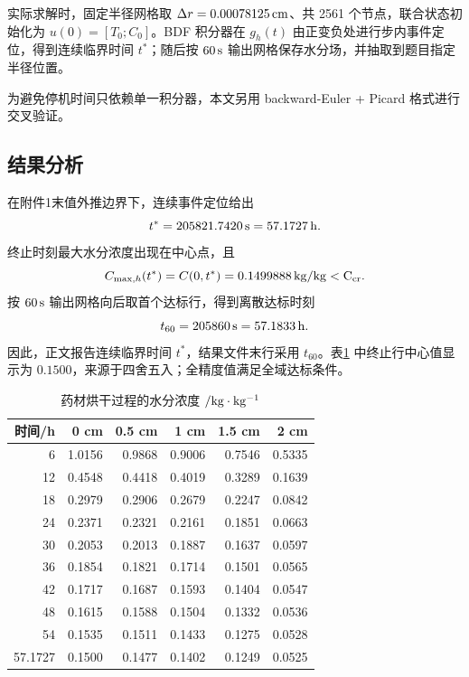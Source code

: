 \documentclass[UTF8,a4paper,12pt]{ctexart}
\begin{document}
实际求解时，固定半径网格取 $\Delta r=0.00078125\rm\,cm$、共 2561 个节点，联合状态初始化为 $u(0)=[T_0;C_0]$。BDF 积分器在 $g_h(t)$ 由正变负处进行步内事件定位，得到连续临界时间 $t^*$；随后按 $60\rm\,s$ 输出网格保存水分场，并抽取到题目指定半径位置。

为避免停机时间只依赖单一积分器，本文另用 backward-Euler + Picard 格式进行交叉验证。

\subsection{结果分析}
在附件1末值外推边界下，连续事件定位给出
\begin{equation}
  t^*=205821.7420\rm\,s=57.1727\rm\,h.
\end{equation}
终止时刻最大水分浓度出现在中心点，且
\begin{equation}
  C_{\max,h}(t^*)=C(0,t^*)=0.1499888\rm\,kg/kg<C_{\rm cr}.
\end{equation}
按 $60\rm\,s$ 输出网格向后取首个达标行，得到离散达标时刻
\begin{equation}
  t_{60}=205860\rm\,s=57.1833\rm\,h.
\end{equation}
因此，正文报告连续临界时间 $t^*$，结果文件末行采用 $t_{60}$。表\ref{tab:q3-moist} 中终止行中心值显示为 $0.1500$，来源于四舍五入；全精度值满足全域达标条件。

\begin{table}[H]
  \centering
  \caption{药材烘干过程的水分浓度 $/\rm kg\cdot kg^{-1}$}
  \label{tab:q3-moist}
  \begin{tabular}{rrrrrr}
    \toprule
    时间/h & 0 cm & 0.5 cm & 1 cm & 1.5 cm & 2 cm\\ \midrule
    6 & 1.0156 & 0.9868 & 0.9006 & 0.7546 & 0.5335\\
    12 & 0.4548 & 0.4418 & 0.4019 & 0.3289 & 0.1639\\
    18 & 0.2979 & 0.2906 & 0.2679 & 0.2247 & 0.0842\\
    24 & 0.2371 & 0.2321 & 0.2161 & 0.1851 & 0.0663\\
    30 & 0.2053 & 0.2013 & 0.1887 & 0.1637 & 0.0597\\
    36 & 0.1854 & 0.1821 & 0.1714 & 0.1501 & 0.0565\\
    42 & 0.1717 & 0.1687 & 0.1593 & 0.1404 & 0.0547\\
    48 & 0.1615 & 0.1588 & 0.1504 & 0.1332 & 0.0536\\
    54 & 0.1535 & 0.1511 & 0.1433 & 0.1275 & 0.0528\\
    57.1727 & 0.1500 & 0.1477 & 0.1402 & 0.1249 & 0.0525\\
    \bottomrule
  \end{tabular}
\end{table}
\end{document}
